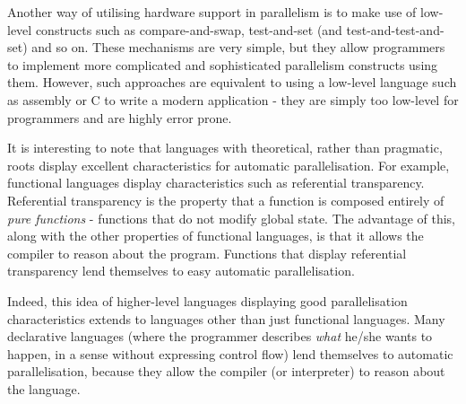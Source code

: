 Another way of utilising hardware support in parallelism is to make use of low-level constructs such as compare-and-swap, test-and-set (and test-and-test-and-set) and so on. These mechanisms are very simple, but they allow programmers to implement more complicated and sophisticated parallelism constructs using them. However, such approaches are equivalent to using a low-level language such as assembly or C to write a modern application - they are simply too low-level for programmers and are highly error prone.

It is interesting to note that languages with theoretical, rather than pragmatic, roots display excellent characteristics for automatic parallelisation. For example, functional languages display characteristics such as referential transparency. Referential transparency is the property that a function is composed entirely of \textit{pure functions} - functions that do not modify global state. The advantage of this, along with the other properties of functional languages, is that it allows the compiler to reason about the program. Functions that display referential transparency lend themselves to easy automatic parallelisation.

Indeed, this idea of higher-level languages displaying good parallelisation characteristics extends to languages other than just functional languages. Many declarative languages (where the programmer describes \emph{what} he/she wants to happen, in a sense without expressing control flow) lend themselves to automatic parallelisation, because they allow the compiler (or interpreter) to reason about the language.